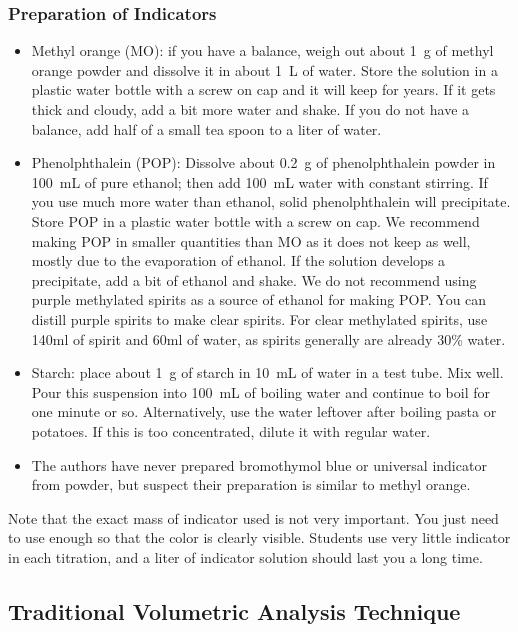 \subsubsection{Preparation of Indicators}
\begin{itemize}

\item{Methyl orange (MO): if you have a balance, weigh out about 1~g of methyl orange powder and dissolve it in about 1~L of water. Store the solution in a 
plastic water bottle with a screw on cap and it will keep for years. If it gets thick and cloudy, add a bit more water and shake. If you do not have a balance, add half of a small tea spoon to a liter of water.}

\item{Phenolphthalein (POP): Dissolve about 0.2~g of phenolphthalein powder in 100~mL of pure ethanol; then add 100~mL water with constant stirring. If you use 
much more water than ethanol, solid phenolphthalein will precipitate. Store POP in a plastic water bottle with a screw on cap. We recommend making POP in smaller quantities than MO as it does not keep as well, mostly due to the evaporation of ethanol. If the solution develops a precipitate, add a bit of ethanol and shake. We do not recommend using purple methylated spirits as a source of ethanol for making POP. You can distill purple spirits to make clear spirits. For clear methylated spirits, use 140ml of spirit and 60ml of water, as spirits generally are already 30\% water.}

\item{Starch: place about 1~g of starch in 10~mL of water in a test tube. Mix well. Pour this suspension into 100~mL of boiling water and continue to boil for 
one minute or so. Alternatively, use the water leftover after boiling pasta or potatoes. If this is too concentrated, dilute it with regular water.}

\item{The authors have never prepared bromothymol blue or universal indicator from powder, but suspect their preparation is similar to methyl orange.}

\end{itemize}

Note that the exact mass of indicator used is not very important. You just need to use enough so that the color is clearly visible. Students use very little indicator in each titration, and a liter of indicator solution should last you a long time.

\subsection{Traditional Volumetric Analysis Technique}
\label{cha:volanatech}

